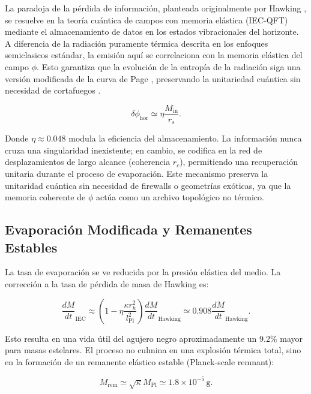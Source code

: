 \documentclass[11pt,a4paper]{article}
\begin{document}
La paradoja de la pérdida de información, planteada originalmente por Hawking \cite{Hawking1975}, se resuelve en la teoría cuántica de campos con memoria elástica (IEC-QFT) mediante el almacenamiento de datos en los estados vibracionales del horizonte. A diferencia de la radiación puramente térmica descrita en los enfoques semiclasicos estándar, la emisión aquí se correlaciona con la memoria elástica del campo \( \phi \). Esto garantiza que la evolución de la entropía de la radiación siga una versión modificada de la curva de Page \cite{Page1993}, preservando la unitariedad cuántica sin necesidad de cortafuegos \cite{Susskind1995}.

\begin{equation}
	\delta \phi_{\text{hor}} \simeq \eta \frac{M_{\text{in}}}{r_s}.
\end{equation}

Donde \( \eta \approx 0.048 \) modula la eficiencia del almacenamiento. La información nunca cruza una singularidad inexistente; en cambio, se codifica en la red de desplazamientos de largo alcance (coherencia \( r_c \)), permitiendo una recuperación unitaria durante el proceso de evaporación. Este mecanismo preserva la unitaridad cuántica sin necesidad de firewalls o geometrías exóticas, ya que la memoria coherente de \( \phi \) actúa como un archivo topológico no térmico.

\subsection{Evaporación Modificada y Remanentes Estables}

La tasa de evaporación se ve reducida por la presión elástica del medio. La corrección a la tasa de pérdida de masa de Hawking es:

\begin{equation}
	\frac{dM}{dt}_{\text{IEC}} \approx \left(1 - \eta \frac{\kappa r_h^2}{l_{\text{Pl}}^2}\right) \frac{dM}{dt}_{\text{Hawking}} \simeq 0.908 \frac{dM}{dt}_{\text{Hawking}}.
\end{equation}

Esto resulta en una vida útil del agujero negro aproximadamente un 9.2\% mayor para masas estelares. El proceso no culmina en una explosión térmica total, sino en la formación de un remanente elástico estable (Planck-scale remnant):

\begin{equation}
	\boxed{M_{\text{rem}} \simeq \sqrt{\kappa} M_{\text{Pl}} \simeq 1.8 \times 10^{-5} \, \text{g}}.
\end{equation}
\end{document}
